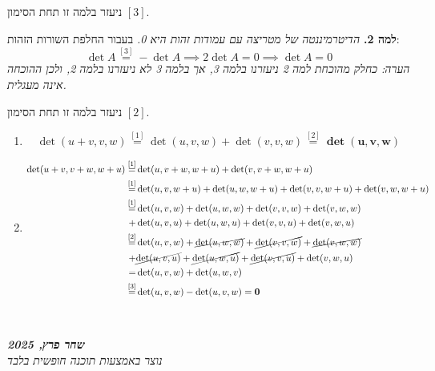 \documentclass[]{article}
\newcommand\ndoc  {\dotfill \\ \vfil {\begin{center} {\textbf{\textit{שחר פרץ, 2025}} \\ \scriptsize \textit{נוצר באמצעות תוכנה חופשית בלבד}} \end{center}} \vfil	}
\begin{document}
	ניעזר בלמה זו תחת הסימון $[3]$. 
	
	\textbf{למה 2. }	\textit{הדיטרמיננטה של מטריצה עם עמודות זהות היא 0. }בעבור החלפת השורות הזהות: 
	\[ \det A \overset{[3]}{=} -\det A \implies 2\det A = 0 \implies \det A = 0 \]
	\textit{הערה: כחלק מהוכחת למה 2 ניעזרנו בלמה 3, אך בלמה 3 לא ניעזרנו בלמה 2, ולכן ההוכחה אינה מעגלית. }
	
	ניעזר בלמה זו תחת הסימון $[2]$. 
	
	\begin{enumerate}
		\item 
		\[ \det(u + v, v, w) \overset{[1]}{=} \det(u, v, w) + \det(v, v, w) \overset{[2]}{=} \bm{\det(u, v, w)} \]
		\item 
		\begin{align*}
			\det(u + v, v + w, w + u)
			\overset{[1]}{=} &\det(u, v + w, w + u) + \det(v, v + w, w + u) \\
			\overset{[1]}{=} &\det(u, v, w + u) + \det(u, w, w + u) + \det(v, v, w + u) + \det(v, w, w + u) \\
			\overset{[1]}{=} &\det(u, v, w) + \det(u, w, w) + \det(v, v, w) + \det(v, w, w) \\
			+&\det(u, v, u) + \det(u, w, u) + \det(v, v, u) + \det(v, w, u) \\
			\overset{[2]}{=} &\det(u, v, w) + \cancel{\det(u, w, w)} + \cancel{\det(v, v, w)} + \cancel{\det(v, w, w)} \\
			+&\cancel{\det(u, v, u)} + \cancel{\det(u, w, u)} + \cancel{\det(v, v, u)} + \det(v, w, u) \\
			=&\det(u, v, w) + \det(u, w, v) \\
			\overset{[3]}{=}&\det(u, v, w) - \det(u, v, w) = \bm{0}
		\end{align*}
	\end{enumerate}
	
	\ndoc
	
\end{document}
